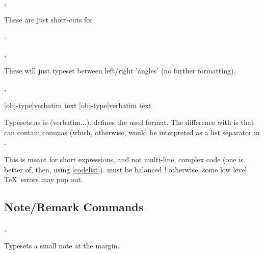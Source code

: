 \documentclass{article}
\begin{document}
\begin{codedescribe}[code]{\typesetmacro,\tsmacro}
\begin{codesyntax}
\end{codesyntax}
These are just short-cuts for\par {}  .
\end{codedescribe}

\begin{codedescribe}[code]{\typesetmeta,\tsmeta}
\begin{codesyntax}
\end{codesyntax}
 These will just typeset  between left/right 'angles' (no further formatting).
\end{codedescribe}

\begin{codedescribe}[code]{\typesetverb,\tsverb}
\begin{codesyntax}
\tsmacro{\typesetverb}[obj-type]{verbatim text}
\tsmacro{\tsverb}[obj-type]{verbatim text}
\end{codesyntax}
 Typesets  as is (verbatim...).  defines the used format. The difference with  is that  can contain commas (which, otherwise, would be interpreted as a list separator in \tsobj{\tsobj}.
\end{codedescribe}
\begin{tsremark}
This is meant for short expressions, and not multi-line, complex code (one is better of, then, using \ref{codelist}).   must be balanced ! otherwise, some low level \TeX\ errors may pop out.
\end{tsremark}

\subsection{Note/Remark Commands}\label{note-commands}


\begin{codedescribe}[code]{\typesetmarginnote,\tsmarginnote}
\begin{codesyntax}
\end{codesyntax}
Typesets a small note at the margin.
\end{codedescribe}
\end{document}
